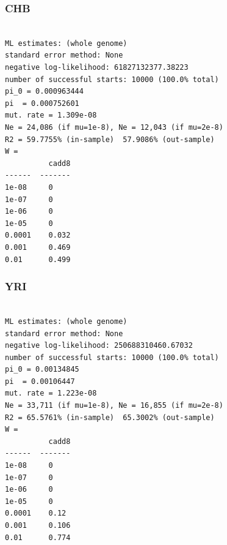 \documentclass[11pt]{article}
\begin{document}
\subsubsection*{CHB}
\begin{minipage}{\linewidth}\begin{footnotesize}
\begin{verbatim}

ML estimates: (whole genome)
standard error method: None
negative log-likelihood: 61827132377.38223
number of successful starts: 10000 (100.0% total)
pi_0 = 0.000963444
pi  = 0.000752601
mut. rate = 1.309e-08 
Ne = 24,086 (if mu=1e-8), Ne = 12,043 (if mu=2e-8)
R2 = 59.7755% (in-sample)  57.9086% (out-sample)
W = 
          cadd8
------  -------
1e-08     0
1e-07     0
1e-06     0
1e-05     0
0.0001    0.032
0.001     0.469
0.01      0.499
\end{verbatim}
\end{footnotesize}\end{minipage}


\subsubsection*{YRI}
\begin{minipage}{\linewidth}\begin{footnotesize}
\begin{verbatim}

ML estimates: (whole genome)
standard error method: None
negative log-likelihood: 250688310460.67032
number of successful starts: 10000 (100.0% total)
pi_0 = 0.00134845
pi  = 0.00106447
mut. rate = 1.223e-08 
Ne = 33,711 (if mu=1e-8), Ne = 16,855 (if mu=2e-8)
R2 = 65.5761% (in-sample)  65.3002% (out-sample)
W = 
          cadd8
------  -------
1e-08     0
1e-07     0
1e-06     0
1e-05     0
0.0001    0.12
0.001     0.106
0.01      0.774
\end{verbatim}
\end{footnotesize}\end{minipage}


\printbibliography
\end{document}
